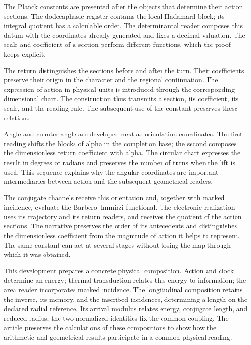 
The Planck constants are presented after the objects that determine their
action sections. The dodecaphasic register contains the local Hadamard block;
its integral quotient has a calculable order. The determinantal reader
composes this datum with the coordinates already generated and fixes a
decimal valuation. The scale and coefficient of a section perform different
functions, which the proof keeps explicit.

The return distinguishes the sections before and after the turn. Their
coefficients preserve their origin in the character and the regional
continuation. The expression of action in physical units is introduced
through the corresponding dimensional chart. The construction thus
transmits a section, its coefficient, its scale, and the reading rule.
The subsequent use of the constant preserves these relations.

Angle and counter-angle are developed next as orientation coordinates.
The first reading shifts the blocks of alpha in the completion base; the
second composes the dimensionless return coefficient with alpha. The
circular chart expresses the result in degrees or radians and preserves
the number of turns when the lift is used. This sequence explains why
the angular coordinates are important intermediaries between action and
the subsequent geometrical readers.

The conjugate channels receive this orientation and, together with marked
incidence, evaluate the Barbero--Immirzi functional. The electronic
realization uses its trajectory and its return readers, and receives the
quotient of the action sections. The narrative preserves the order of its
antecedents and distinguishes the dimensionless coefficient from the
magnitude of action it helps to represent. The same constant can act at
several stages without losing the map through which it was obtained.

This development prepares a concrete physical composition. Action and clock
determine an energy; thermal transduction relates this energy to
information; the area reader incorporates marked incidence. The
longitudinal composition retains the inverse, its memory, and the
inscribed incidences, determining a length on the declared radial
reference. Its arrival modulus relates energy, conjugate length, and
reduced radius; the two normalized identities fix the common coupling.
The article preserves the calculations of these compositions to show
how the arithmetic and geometrical results participate in a common physical
reading.
